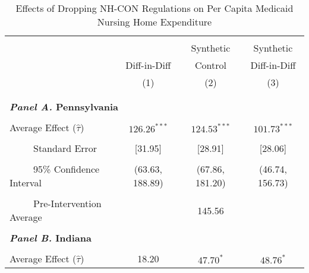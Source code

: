 \documentclass[../Main.tex]{subfiles}
\begin{document}




\newpage
\null
\vfill
\begin{table}[htbp]\centering \footnotesize
\def\sym#1{\ifmmode^{#1}\else\(^{#1}\)\fi}
\captionsetup{width=.8\textwidth}
\caption{\centering Effects of Dropping NH-CON Regulations on Per Capita Medicaid Nursing Home Expenditure}
\label{tab:ave_results_med_exp_nobord_nocov}
\setlength{\tabcolsep}{10pt}
\begin{tabular}{l*{3}{c}}
\hline\hline
\\[-2ex]
&\multicolumn{1}{c}{}&\multicolumn{1}{c}{Synthetic}&\multicolumn{1}{c}{Synthetic}\\
&\multicolumn{1}{c}{Diff-in-Diff}&\multicolumn{1}{c}{Control}&\multicolumn{1}{c}{Diff-in-Diff}\\
&\multicolumn{1}{c}{(1)}&\multicolumn{1}{c}{(2)}&\multicolumn{1}{c}{(3)}\\
\\[-2ex]
\hline
\\[-.1ex]
\multicolumn{4}{l}{\textbf{\textit{Panel A.} Pennsylvania}}\\
\\[-1.5ex]
\multicolumn{1}{l}{Average Effect ($\hat{\tau}$)}&   \multicolumn{1}{c}{$126.26^{***}$}&   \multicolumn{1}{c}{$124.53^{***}$}&  \multicolumn{1}{c}{$101.73^{***}$}\\
\\[-2ex]
\multicolumn{1}{l}{\ \ \ \ \ Standard Error}  &\multicolumn{1}{c}{[31.95]}&\multicolumn{1}{c}{[28.91]}&\multicolumn{1}{c}{[28.06]}\\
\\[-2ex]
\multicolumn{1}{l}{\ \ \ \ \ 95\% Confidence Interval}&   \multicolumn{1}{c}{(63.63, 188.89)}&   \multicolumn{1}{c}{(67.86, 181.20)}&   \multicolumn{1}{c}{(46.74, 156.73)}\\
\\[-2ex]
\multicolumn{1}{l}{\ \ \ \ \ Pre-Intervention Average}&   \multicolumn{3}{c}{145.56}\\
\\[-.1ex]
\multicolumn{4}{l}{\textbf{\textit{Panel B.} Indiana}}\\
\\[-1.5ex]
\multicolumn{1}{l}{Average Effect ($\hat{\tau}$)}&   \multicolumn{1}{c}{18.20}&   \multicolumn{1}{c}{$47.70^{*}$}&  \multicolumn{1}{c}{$48.76^{*}$}\\

\end{tabular}
\end{table}
\end{document}
